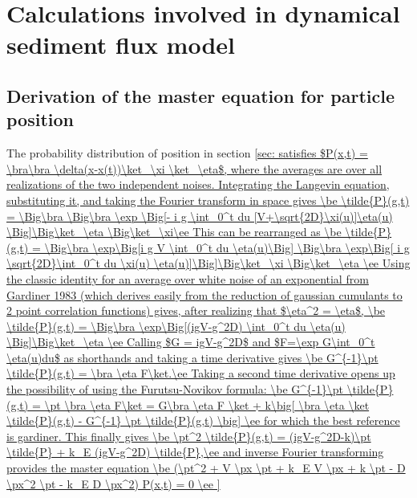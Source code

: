 
\chapter{Calculations involved in dynamical sediment flux model}
\label{sec:appendixA}
\section{Derivation of the master equation for particle position}
\label{sec:appAmaster}
The probability distribution of position in section \ref{sec: satisfies $P(x,t) = \bra\bra \delta(x-x(t))\ket_\xi \ket_\eta$, where the averages are over all realizations of the two independent noises.
Integrating the Langevin equation, substituting it, and taking the Fourier transform in space gives
\be \tilde{P}(g,t) = \Big\bra  \Big\bra \exp \Big[- i g \int_0^t du [V+\sqrt{2D}\xi(u)]\eta(u) \Big]\Big\ket_\eta \Big\ket_\xi\ee
This can be rearranged as
\be \tilde{P}(g,t) = \Big\bra \exp\Big[i g V \int_0^t du \eta(u)\Big] \Big\bra \exp\Big[ i g \sqrt{2D}\int_0^t du \xi(u) \eta(u)]\Big]\Big\ket_\xi \Big\ket_\eta \ee
Using the classic identity for an average over white noise of an exponential  from Gardiner 1983 (which derives easily from the reduction of gaussian cumulants to 2 point correlation functions) gives, after realizing that $\eta^2 = \eta$, 
\be \tilde{P}(g,t) = \Big\bra \exp\Big[(igV-g^2D) \int_0^t du \eta(u) \Big]\Big\ket_\eta \ee
Calling $G = igV-g^2D$ and $F=\exp G\int_0^t \eta(u)du$ as shorthands and taking a time derivative gives
\be G^{-1}\pt \tilde{P}(g,t) = \bra \eta F\ket.\ee
Taking a second time derivative opens up the possibility of using the Furutsu-Novikov formula: 
\be G^{-1}\pt \tilde{P}(g,t) = \pt \bra \eta F\ket = G\bra \eta F \ket + k\big[ \bra \eta \ket \tilde{P}(g,t) - G^{-1} \pt \tilde{P}(g,t) \big] \ee
for which the best reference is gardiner. This finally gives
\be \pt^2 \tilde{P}(g,t)  = (igV-g^2D-k)\pt  \tilde{P} + k_E (igV-g^2D) \tilde{P},\ee
and inverse Fourier transforming provides the master equation
\be (\pt^2 + V \px \pt + k_E V \px + k \pt - D \px^2 \pt - k_E D \px^2) P(x,t) = 0 \ee
}
